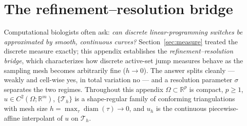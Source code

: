 \documentclass[11pt,a4paper]{article}
\theoremstyle{plain}
\theoremstyle{definition}
\theoremstyle{remark}
\newcommand{\RR}{\mathbb{R}}
\begin{document}
\appendix
\section{The refinement--resolution bridge}
\label{sec:theoremB}

Computational biologists often ask: \emph{can discrete
linear-programming switches be approximated by smooth, continuous
curves?} Section~\ref{sec:measure} treated the discrete measure
exactly; this appendix establishes the \emph{refinement--resolution
bridge}, which characterizes how discrete active-set jump measures
behave as the sampling mesh becomes arbitrarily fine ($h \to 0$).
The answer splits cleanly --- weakly and cell-wise yes,
in total variation no --- and a resolution parameter $\sigma$ separates
the two regimes. Throughout this appendix $\Omega \subset \RR^p$ is compact, $p \ge 1$,
$u \in C^2(\Omega; \RR^m)$, $\{\mathcal{T}_h\}$ is a shape-regular family
of conforming triangulations with mesh size
$h = \max_\tau \operatorname{diam}(\tau) \to 0$, and $u_h$ is the
continuous piecewise-affine interpolant of $u$ on $\mathcal{T}_h$.
\end{document}
